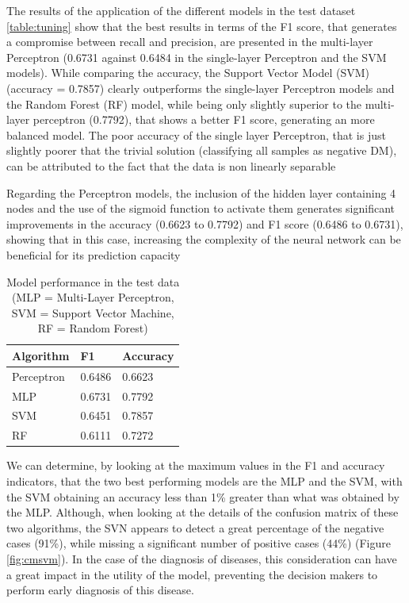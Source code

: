 \documentclass[10pt,twocolumn,letterpaper]{article}
\begin{document}
The results of the application of the different models in the test dataset \ref{table:tuning} show that the best results in terms of the F1 score, that generates a compromise between recall and precision, are presented in the multi-layer Perceptron (0.6731 against 0.6484 in the single-layer Perceptron and the SVM models). While comparing the accuracy, the Support Vector Model (SVM) (accuracy = 0.7857) clearly outperforms the single-layer Perceptron models and the Random Forest (RF) model, while being only slightly superior to the multi-layer perceptron (0.7792), that shows a better F1 score, generating an more balanced model. The poor accuracy of the single layer Perceptron, that is just slightly poorer that the trivial solution (classifying all samples as negative DM), can be attributed to the fact that the data is non linearly separable \cite{Ripley1996}

Regarding the Perceptron models, the inclusion of the hidden layer containing 4 nodes and the use of the sigmoid function to activate them generates significant improvements in the accuracy (0.6623 to 0.7792) and F1 score (0.6486 to 0.6731), showing that in this case, increasing the complexity of the neural network can be beneficial for its prediction capacity

\begin{table}[h]
	\begin{center}
		\begin{tabular}{|p{1.8cm}|p{1.5cm}|p{1.5cm}|}
			\hline
			Algorithm & F1 & Accuracy \\
			\hline\hline
			Perceptron & 0.6486 & 0.6623 \\
			MLP & 0.6731 & 0.7792 \\
			SVM & 0.6451 & 0.7857 \\
			RF & 0.6111 & 0.7272 \\
			\hline
		\end{tabular}
	\end{center}
	\caption{Model performance in the test data (MLP = Multi-Layer Perceptron, SVM = Support Vector Machine, RF = Random Forest)}
	\label{table:testing}
\end{table}

We can determine, by looking at the maximum values in the F1 and accuracy indicators, that the two best performing models are the MLP and the SVM, with the SVM obtaining an accuracy less than 1\% greater than what was obtained by the MLP. Although, when looking at the details of the confusion matrix of these two algorithms, the SVN appears to detect a great percentage of the negative cases (91\%), while  missing a significant number of positive cases (44\%) (Figure \ref{fig:cmsvm}). In the case of the diagnosis of diseases, this consideration can have a great impact in the utility of the model, preventing the decision makers to perform early diagnosis of this disease.
\end{document}
